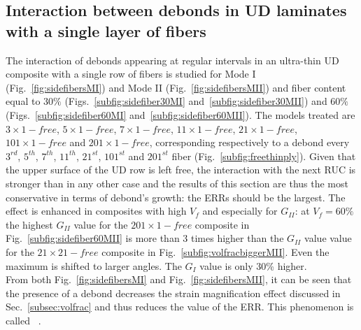 \documentclass[review]{elsarticle}
\begin{document}
\subsection{Interaction between debonds in UD laminates with a single layer of fibers}\label{subsec:singlefiberud}

The interaction of debonds appearing at regular intervals in an ultra-thin UD composite with a single row of fibers is studied for Mode I (Fig.~\ref{fig:sidefibersMI}) and Mode II (Fig.~\ref{fig:sidefibersMII}) and fiber content equal to $30\%$ (Figs.~\ref{subfig:sidefiber30MI} and~\ref{subfig:sidefiber30MII}) and $60\%$ (Figs.~\ref{subfig:sidefiber60MI} and~\ref{subfig:sidefiber60MII}). The models treated are $3\times 1-free$, $5\times 1-free$, $7\times 1-free$, $11\times 1-free$, $21\times 1-free$, $101\times 1-free$ and $201\times 1-free$, corresponding respectively to a debond every $3^{rd}$, $5^{th}$, $7^{th}$, $11^{th}$, $21^{st}$, $101^{st}$ and $201^{st}$ fiber (Fig.~\ref{subfig:freethinply}). Given that the upper surface of the UD row is left free, the interaction with the next RUC is stronger than in any other case and the results of this section are thus the most conservative in terms of debond's growth: the ERRs should be the largest. The effect is enhanced in composites with high $V_{f}$ and especially for $G_{II}$: at $V_{f}=60\%$ the highest $G_{II}$ value for the $201\times 1-free$ composite in Fig.~\ref{subfig:sidefiber60MII} is more than $3$ times higher than the $G_{II}$ value value for the $21\times21-free$ composite in Fig.~\ref{subfig:volfracbiggerMII}. Even the maximum is shifted to larger angles. The $G_{I}$ value is only 30\% higher.\\
From both Fig.~\ref{fig:sidefibersMI} and Fig.~\ref{fig:sidefibersMII}, it can be seen that the presence of a debond decreases the strain magnification effect discussed in Sec.~\ref{subsec:volfrac} and thus reduces the value of the ERR. This phenomenon is called ~\cite{Garcia2015}.
\end{document}
